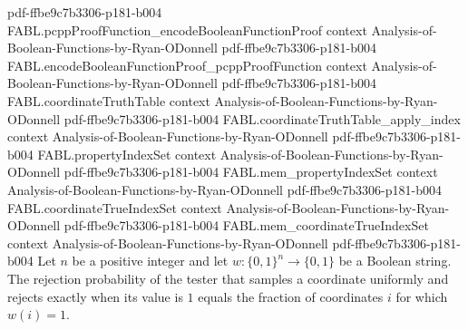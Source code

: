 \begin{theorem}
  {pdf-ffbe9c7b3306-p181-b004}
\proofstep
  {FABL.pcppProofFunction_encodeBooleanFunctionProof}
  {context}
  {Analysis-of-Boolean-Functions-by-Ryan-ODonnell}
  {pdf-ffbe9c7b3306-p181-b004}
\proofstep
  {FABL.encodeBooleanFunctionProof_pcppProofFunction}
  {context}
  {Analysis-of-Boolean-Functions-by-Ryan-ODonnell}
  {pdf-ffbe9c7b3306-p181-b004}
\proofstep
  {FABL.coordinateTruthTable}
  {context}
  {Analysis-of-Boolean-Functions-by-Ryan-ODonnell}
  {pdf-ffbe9c7b3306-p181-b004}
\proofstep
  {FABL.coordinateTruthTable_apply_index}
  {context}
  {Analysis-of-Boolean-Functions-by-Ryan-ODonnell}
  {pdf-ffbe9c7b3306-p181-b004}
\proofstep
  {FABL.propertyIndexSet}
  {context}
  {Analysis-of-Boolean-Functions-by-Ryan-ODonnell}
  {pdf-ffbe9c7b3306-p181-b004}
\proofstep
  {FABL.mem_propertyIndexSet}
  {context}
  {Analysis-of-Boolean-Functions-by-Ryan-ODonnell}
  {pdf-ffbe9c7b3306-p181-b004}
\proofstep
  {FABL.coordinateTrueIndexSet}
  {context}
  {Analysis-of-Boolean-Functions-by-Ryan-ODonnell}
  {pdf-ffbe9c7b3306-p181-b004}
\proofstep
  {FABL.mem_coordinateTrueIndexSet}
  {context}
  {Analysis-of-Boolean-Functions-by-Ryan-ODonnell}
  {pdf-ffbe9c7b3306-p181-b004}
Let $n$ be a positive integer and let $w\colon\{0,1\}^n\to\{0,1\}$ be a Boolean string.
The rejection probability of the tester that samples a coordinate uniformly and rejects
exactly when its value is $1$ equals the fraction of coordinates $i$ for which $w(i)=1$.
\end{theorem}

